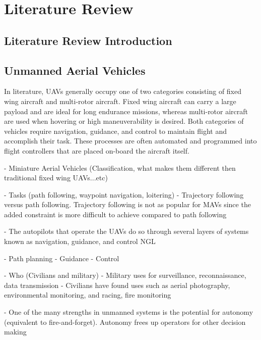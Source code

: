 \documentclass[numbered,pdftex]{ohio-etd}
\begin{document}
\chapter{Literature Review}
\section{Literature Review Introduction}
% 


\section{Unmanned Aerial Vehicles}

In literature, UAVs generally occupy one of two categories consisting of fixed wing aircraft and multi-rotor aircraft. Fixed wing aircraft can carry a large payload and are ideal for long endurance missions, whereas multi-rotor aircraft are used when hovering or high maneuverability is desired. Both categories of vehicles require navigation, guidance, and control to maintain flight and accomplish their task. These processes are often automated and programmed into flight controllers that are placed on-board the aircraft itself. 

 - Miniature Aerial Vehicles (Classification, what makes them different then traditional fixed wing UAVs...etc)

 - Tasks (path following, waypoint navigation, loitering)
 - Trajectory following versus path following. Trajectory following is not as popular for MAVs since the added constraint is more difficult to achieve compared to path following
 
 - The autopilots that operate the UAVs do so through several layers of systems known as navigation, guidance, and control NGL
 
 - Path planning
 - Guidance
 - Control
 
 - Who (Civilians and military)
 - Military uses for surveillance, reconnaissance, data transmission
 - Civilians have found uses such as aerial photography, environmental monitoring, and racing, fire monitoring
 
 - One of the many strengths in unmanned systems is the potential for autonomy (equivalent to fire-and-forget). Autonomy frees up operators for other decision making
 
\end{document}
